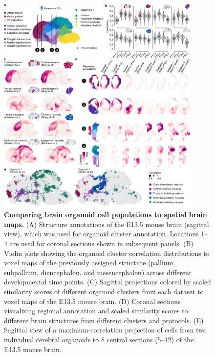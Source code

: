 \begin{figure}[t!]
    \centering
	\includegraphics[width=0.9\textwidth]{figures/voxhunt/Figure_4}
    \caption{\textbf{Comparing brain organoid cell populations to spatial brain maps.} (A) Structure annotations of the E13.5 mouse brain (sagittal view), which was used for organoid cluster annotation. Locations 1–4 are used for coronal sections shown in subsequent panels. (B) Violin plots showing the organoid cluster correlation distributions to voxel maps of the previously assigned structure (pallium, subpallium, diencephalon, and mesencephalon) across different developmental time points. (C) Sagittal projections colored by scaled similarity scores of different organoid clusters from each dataset to voxel maps of the E13.5 mouse brain. (D) Coronal sections visualizing regional annotation and scaled similarity scores to different brain structures from different clusters and protocols. (E) Sagittal view of a maximum-correlation projection of cells from two individual cerebral organoids to 8 central sections (5–12) of the E13.5 mouse brain.}
    \label{fig:vox4}
\end{figure}


